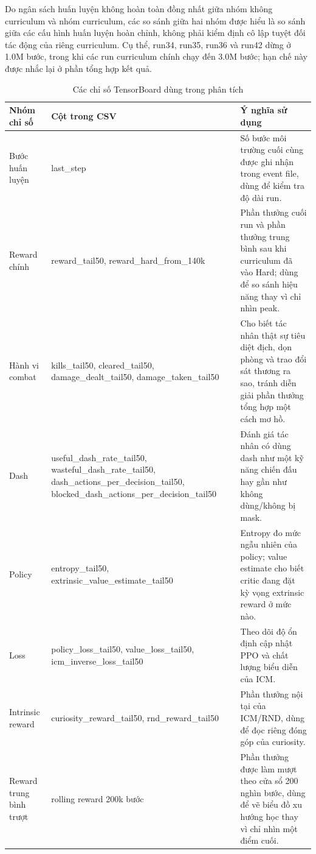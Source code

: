 Do ngân sách huấn luyện không hoàn toàn đồng nhất giữa nhóm không curriculum và nhóm curriculum, các so sánh giữa hai nhóm được hiểu là so sánh giữa các cấu hình huấn luyện hoàn chỉnh, không phải kiểm định cô lập tuyệt đối tác động của riêng curriculum. Cụ thể, run34, run35, run36 và run42 dừng ở 1.0M bước, trong khi các run curriculum chính chạy đến 3.0M bước; hạn chế này được nhắc lại ở phần tổng hợp kết quả.
\begin{table}[H]
    \centering
    \small
    \setlength{\tabcolsep}{4pt}
    \renewcommand{\arraystretch}{1.25}
    \caption{Các chỉ số TensorBoard dùng trong phân tích}
    \label{tab:tensorboard_metrics}
    \begin{tabular}{|>{\raggedright\arraybackslash}p{3.4cm}|>{\raggedright\arraybackslash}p{6.2cm}|>{\raggedright\arraybackslash}p{6.2cm}|}
        \hline
        \textbf{Nhóm chỉ số} & \textbf{Cột trong CSV} & \textbf{Ý nghĩa sử dụng} \\
        \hline
        Bước huấn luyện & last\_step & Số bước môi trường cuối cùng được ghi nhận trong event file, dùng để kiểm tra độ dài run. \\
        \hline
        Reward chính & reward\_tail50, reward\_hard\_from\_140k & Phần thưởng cuối run và phần thưởng trung bình sau khi curriculum đã vào Hard; dùng để so sánh hiệu năng thay vì chỉ nhìn peak. \\
        \hline
        Hành vi combat & kills\_tail50, cleared\_tail50, damage\_dealt\_tail50, damage\_taken\_tail50 & Cho biết tác nhân thật sự tiêu diệt địch, dọn phòng và trao đổi sát thương ra sao, tránh diễn giải phần thưởng tổng hợp một cách mơ hồ. \\
        \hline
        Dash & useful\_dash\_rate\_tail50, wasteful\_dash\_rate\_tail50, dash\_actions\_per\_decision\_tail50, blocked\_dash\_actions\_per\_decision\_tail50 & Đánh giá tác nhân có dùng dash như một kỹ năng chiến đấu hay gần như không dùng/không bị mask. \\
        \hline
        Policy & entropy\_tail50, extrinsic\_value\_estimate\_tail50 & Entropy đo mức ngẫu nhiên của policy; value estimate cho biết critic đang đặt kỳ vọng extrinsic reward ở mức nào. \\
        \hline
        Loss & policy\_loss\_tail50, value\_loss\_tail50, icm\_inverse\_loss\_tail50 & Theo dõi độ ổn định cập nhật PPO và chất lượng biểu diễn của ICM. \\
        \hline
        Intrinsic reward & curiosity\_reward\_tail50, rnd\_reward\_tail50 & Phần thưởng nội tại của ICM/RND, dùng để đọc riêng đóng góp của curiosity. \\
        \hline
        Reward trung bình trượt & rolling reward 200k bước & Phần thưởng được làm mượt theo cửa sổ 200 nghìn bước, dùng để vẽ biểu đồ xu hướng học thay vì chỉ nhìn một điểm cuối. \\
        \hline
    \end{tabular}
\end{table}

